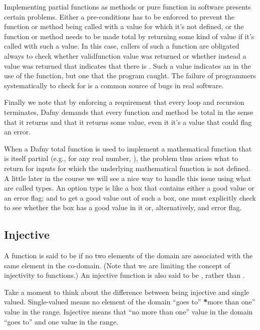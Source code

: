 \documentclass[letterpaper,10pt,english]{sphinxmanual}
\begin{document}
Implementing partial functions as methods or pure function in software
presents certain problems. Either a pre-conditions has to be enforced
to prevent the function or method being called with a value for which
it’s not defined, or the function or method needs to be made total by
returning some kind of  value if it’s called with such a value.
In this case, callers of such a function are obligated always to check
whether  validfunction value was returned or whether instead a
value was returned that indicates that there is . Such
a value indicates an  in the use of the function, but one that
the program caught. The failure of programmers systematically to check
for  is a common source of bugs in real software.

Finally we note that by enforcing a requirement that every loop and
recursion terminates, Dafny demands that every function and method be
total in the sense that it returns and that it returns some value,
even it it’s a value that could flag an error.

When a Dafny total function is used to implement a mathematical
function that is itself partial (e.g.,  for any real number,
), the problem thus arises what to return for inputs for which the
underlying mathematical function is not defined.  A little later in
the course we will see a nice way to handle this issue using what are
called  types. An option type is like a box that contains
either a good value or an error flag; and to get a good value out of
such a box, one must explicitly check to see whether the box has a
good value in it or, alternatively, and error flag.


\subsection{Injective}
\label{\detokenize{08-relations:injective}}
A function is said to be  if no two elements of the domain
are associated with the same element in the co-domain. (Note that we
are limiting the concept of injectivity to functions.) An injective
function is also said to be , rather than .

Take a moment to think about the difference between being injective
and single valued. Single-valued means no  element of the domain
“goes to” {\color{red}\bfseries{}*}more than one” value in the range. Injective means that “no
more than one” value in the domain “goes to” and one value in the
range.
\end{document}
